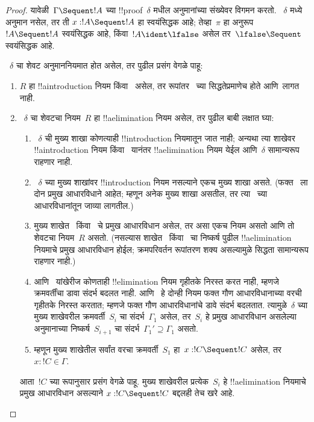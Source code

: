 \documentclass[../../../include/open-logic-section]{subfiles}
\begin{document}
\begin{proof}
यावेळी~$\Gamma \Sequent !A$ च्या !!{proof}~$\delta$
मधील अनुमानांच्या संख्येवर विगमन करतो.
~$\delta$ मध्ये अनुमान नसेल, तर ती
$x:!A \Sequent !A$ हा स्वयंसिद्धक आहे;
तेव्हा~$\pi$ हा अनुरूप~$!A \Sequent !A$
स्वयंसिद्धक आहे, किंवा~$!A \ident \lfalse$
असेल तर~$\lfalse \Sequent \ $ स्वयंसिद्धक आहे.

~$\delta$ चा शेवट अनुमाननियमात होत असेल,
तर पुढील प्रसंग वेगळे पाहू:
\begin{enumerate}
  \item $R$ हा !!a{introduction} नियम किंवा~\FalseInt
  असेल, तर रूपांतर~
  च्या सिद्धतेप्रमाणेच होते आणि~\Cut लागत नाही.

  \item ~$\delta$ चा शेवटचा नियम~$R$ हा !!a{elimination} नियम
  असेल, तर पुढील बाबी लक्षात घ्या:
  \begin{enumerate}
    \item ~$\delta$ ची मुख्य शाखा कोणत्याही
    !!{introduction} नियमातून जात नाही; अन्यथा त्या
    शाखेवर !!a{introduction} नियम किंवा~\FalseInt{}
    यानंतर !!a{elimination} नियम येईल आणि~$\delta$
    सामान्यरूप राहणार नाही.
    \item ~$\delta$ च्या मुख्य शाखांवर
    !!{introduction} नियम नसल्याने एकच मुख्य शाखा
    असते. (फक्त~\Intro{\land} ला दोन प्रमुख
    आधारविधाने आहेत; म्हणून अनेक मुख्य शाखा असतील,
    तर त्या~\Intro{\land} च्या आधारविधानांतून जाव्या लागतील.)
    \item मुख्य शाखेत~\Elim{\lor} किंवा~\Elim{\lexists}
    चे प्रमुख आधारविधान असेल, तर असा एकच नियम
    असतो आणि तो शेवटचा नियम~$R$ असतो. (नसल्यास
    शाखेत~\Elim{\lor} किंवा~\Elim{\lexists}
    चा निष्कर्ष पुढील !!a{elimination} नियमाचे प्रमुख
    आधारविधान होईल; क्रमपरिवर्तन रूपांतरण शक्य असल्यामुळे
    सिद्धता सामान्यरूप राहणार नाही.)
  \item \Elim{\lor} आणि~\Elim{\lexists} यांखेरीज
  कोणताही !!{elimination} नियम गृहीतके निरस्त करत नाही,
  म्हणजे क्रमवर्तींचा डावा संदर्भ बदलत नाही.
  \Elim{\lor} आणि~\Elim{\lexists} हे दोन्ही नियम
  फक्त गौण आधारविधानाच्या वरची
  गृहीतके निरस्त करतात; म्हणजे फक्त गौण
  आधारविधानांचे डावे संदर्भ बदलतात.
  त्यामुळे~$\delta$ च्या मुख्य शाखेवरील
  क्रमवर्ती~$S_i$ चा संदर्भ~$\Gamma_1$ असेल,
  तर~$S_i$ हे प्रमुख आधारविधान असलेल्या अनुमानाच्या
  निष्कर्ष~$S_{i+1}$ चा संदर्भ~$\Gamma_1' \supseteq \Gamma_1$
  असतो.
  \item म्हणून मुख्य शाखेतील सर्वांत वरचा
  क्रमवर्ती~$S_1$ हा~$x: !C \Sequent !C$
  असेल, तर~$x:!C \in \Gamma$.
  \end{enumerate}
  आता~$!C$ च्या रूपानुसार प्रसंग वेगळे पाहू.
  मुख्य शाखेवरील प्रत्येक~$S_i$ हे !!a{elimination}
  नियमाचे प्रमुख आधारविधान असल्याने
  $x:!C \Sequent !C$ बद्दलही तेच खरे आहे.


\end{enumerate}
\end{proof}
\end{document}
